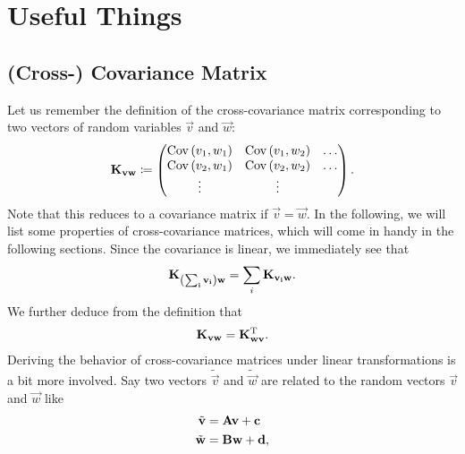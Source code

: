 \documentclass[12pt,a4paper]{scrarticle}
\begin{document}
\maketitle

\begin{abstract}
    
\end{abstract}

\tableofcontents

\section{Useful Things}
\subsection{(Cross-) Covariance Matrix}
Let us remember the definition of the cross-covariance matrix corresponding to two vectors of random variables $\vec{v}$ and $\vec{w}$:
\begin{align*}
    \mathbf{K}_{\mathbf{v} \mathbf{w}} \coloneqq \begin{pmatrix}
        \operatorname{Cov} \left( v_1, w_1 \right) & \operatorname{Cov} \left( v_1, w_2 \right) & \hdots \\
        \operatorname{Cov} \left( v_2, w_1 \right) & \operatorname{Cov} \left( v_2, w_2 \right) & \hdots \\
        \vdots         &\vdots
    \end{pmatrix}.
\end{align*}
Note that this reduces to a covariance matrix if $\vec{v} = \vec{w}$. In the following, we will list some properties of cross-covariance matrices, which will come in handy in the following sections. Since the covariance is linear, we immediately see that 
\begin{align}
    \label{eq:crosscovlinearity}
     \mathbf{K}_{\mathbf{\left(\sum_i v_i\right)} \mathbf{w}} = \sum_i \mathbf{K}_{\mathbf{v_i} \mathbf{w}}.
\end{align}
We further deduce from the definition that 
\begin{align}
\label{eq:crosscovtranspose}
    \mathbf{K}_{\mathbf{v} \mathbf{w}} = \mathbf{K}_{\mathbf{w} \mathbf{v}}^{\mathrm{T}}.
\end{align}
Deriving the behavior of cross-covariance matrices under linear transformations is a bit more involved. Say two vectors $\tilde{\vec{v}}$ and $\tilde{\vec{w}}$ are related to the random vectors $\vec{v}$ and $\vec{w}$ like 
\begin{align*}
    \tilde{\mathbf{v}} &= \mathbf{A} \mathbf{v} + \mathbf{c} \\
    \tilde{\mathbf{w}} &= \mathbf{B} \mathbf{w} + \mathbf{d},
\end{align*}
\end{document}
